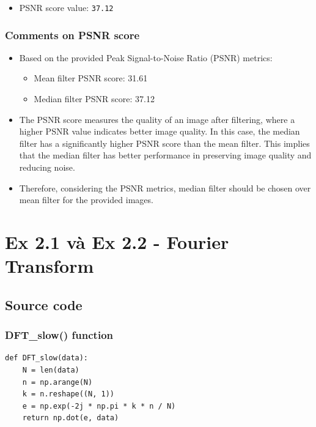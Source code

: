 \documentclass{article}
\begin{document}
\begin{itemize}
    \item PSNR score value: \lstinline{37.12}
\end{itemize}

\subsubsection{Comments on PSNR score}

\begin{itemize}
    \item Based on the provided Peak Signal-to-Noise Ratio (PSNR) metrics:
    \begin{itemize}
        \item Mean filter PSNR score: 31.61
        \item Median filter PSNR score: 37.12
    \end{itemize}
    
    \item The PSNR score measures the quality of an image after filtering, where a higher PSNR value indicates better image quality. In this case, the median filter has a significantly higher PSNR score than the mean filter. This implies that the median filter has better performance in preserving image quality and reducing noise.
    \item Therefore, considering the PSNR metrics, median filter should be chosen over mean filter for the provided images.
    
\end{itemize}



\section{Ex 2.1 và Ex 2.2 - Fourier Transform}
\subsection{Source code}

\subsubsection{DFT\_slow() function}
\begin{lstlisting}[caption={Code of DFT\_slow() function}]
def DFT_slow(data):
    N = len(data)
    n = np.arange(N)
    k = n.reshape((N, 1))
    e = np.exp(-2j * np.pi * k * n / N)
    return np.dot(e, data)
\end{lstlisting}
\end{document}
